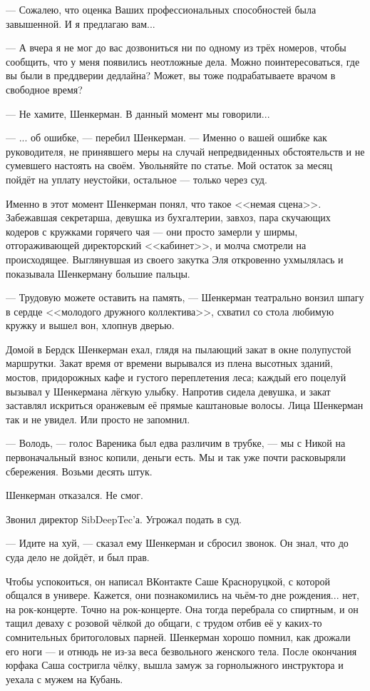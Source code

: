--- Сожалею, что оценка Ваших профессиональных способностей была завышенной.
И я предлагаю вам...

--- А вчера я не мог до вас дозвониться ни по одному из трёх номеров, чтобы сообщить, что у меня появились неотложные дела.
Можно поинтересоваться, где вы были в преддверии дедлайна?
Может, вы тоже подрабатываете врачом в свободное время?

--- Не хамите, Шенкерман.
В данный момент мы говорили...

--- ... об ошибке, --- перебил Шенкерман.
--- Именно о вашей ошибке как руководителя, не принявшего меры на случай непредвиденных обстоятельств и не сумевшего настоять на своём.
Увольняйте по статье.
Мой остаток за месяц пойдёт на уплату неустойки, остальное --- только через суд.

Именно в этот момент Шенкерман понял, что такое <<немая сцена>>.
Забежавшая секретарша, девушка из бухгалтерии, завхоз, пара скучающих кодеров с кружками горячего чая --- они просто замерли у ширмы, отгораживающей директорский <<кабинет>>, и молча смотрели на происходящее.
Выглянувшая из своего закутка Эля откровенно ухмылялась и показывала Шенкерману большие пальцы.

--- Трудовую можете оставить на память, --- Шенкерман театрально вонзил шпагу в сердце <<молодого дружного коллектива>>, схватил со стола любимую кружку и вышел вон, хлопнув дверью.

\asterism

Домой в Бердск Шенкерман ехал, глядя на пылающий закат в окне полупустой маршрутки.
Закат время от времени вырывался из плена высотных зданий, мостов, придорожных кафе и густого переплетения леса;
каждый его поцелуй вызывал у Шенкермана лёгкую улыбку.
Напротив сидела девушка, и закат заставлял искриться оранжевым её прямые каштановые волосы.
Лица Шенкерман так и не увидел.
Или просто не запомнил.

--- Володь, --- голос Вареника был едва различим в трубке, --- мы с Никой на первоначальный взнос копили, деньги есть.
Мы и так уже почти расковыряли сбережения.
Возьми десять штук.

Шенкерман отказался.
Не смог.

Звонил директор SibDeepTec'а.
Угрожал подать в суд.

--- Идите на хуй, --- сказал ему Шенкерман и сбросил звонок.
Он знал, что до суда дело не дойдёт, и был прав.

Чтобы успокоиться, он написал ВКонтакте Саше Красноруцкой, с которой общался в универе.
Кажется, они познакомились на чьём-то дне рождения... нет, на рок-концерте.
Точно на рок-концерте.
Она тогда перебрала со спиртным, и он тащил деваху с розовой чёлкой до общаги, с трудом отбив её у каких-то сомнительных бритоголовых парней.
Шенкерман хорошо помнил, как дрожали его ноги --- и отнюдь не из-за веса безвольного женского тела.
После окончания юрфака Саша состригла чёлку, вышла замуж за горнолыжного инструктора и уехала с мужем на Кубань.

